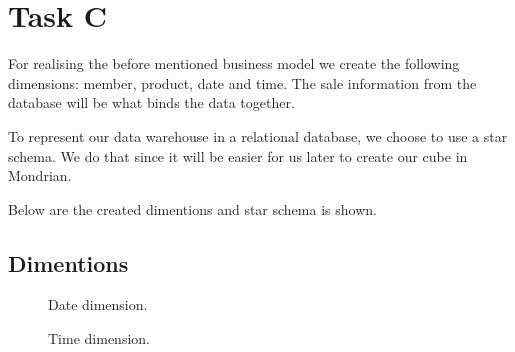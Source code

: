 \section{Task C}
For realising the before mentioned business model we create the following dimensions:
member, product, date and time.
The sale information from the database will be what binds the data together.

To represent our data warehouse in a relational database, we choose to use a star schema.
We do that since it will be easier for us later to create our cube in Mondrian.

Below are the created dimentions and star schema is shown.



\subsection{Dimentions}

\begin{figure}[H]
\centering
    \begin{minipage}[b]{0.4\textwidth}
        \caption{Date dimension.}
        \label{fig:uml_eks2}
    \end{minipage}
    \begin{minipage}[b]{0.4\textwidth}
        \caption{Time dimension.}
        \label{fig:uml_eks2}
    \end{minipage}
\end{figure}

